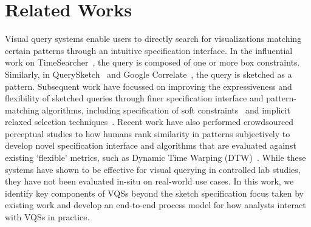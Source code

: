 \section{Related Works \label{sec:relatedworks}}
Visual query systems enable users to directly search for visualizations matching certain patterns through an intuitive specification interface. In the influential work on TimeSearcher~\cite{hochheiser2004dynamic}, the query is composed of one or more box constraints. Similarly, in QuerySketch~\cite{wattenberg2001sketching} and Google Correlate~\cite{mohebbi2011google}, the query is sketched as a pattern. Subsequent work have focussed on improving the expressiveness and flexibility of sketched queries through finer specification interface and pattern-matching algorithms, including specification of soft constraints~\cite{ryall2005querylines} and implicit relaxed selection techniques~\cite{Holz2009}. Recent work have also performed crowdsourced perceptual studies to how humans rank similarity in patterns subjectively to develop novel specification interface and algorithms that are evaluated against existing `flexible' metrics, such as Dynamic Time Warping (DTW)~\cite{Eichmann2015,correll2016semantics,Mannino2018}. While these systems have shown to be effective for visual querying in controlled lab studies, they have not been evaluated in-situ on real-world use cases. In this work, we identify key components of VQSs beyond the sketch specification focus taken by existing work and develop an end-to-end process model for how analysts interact with VQSs in practice.




